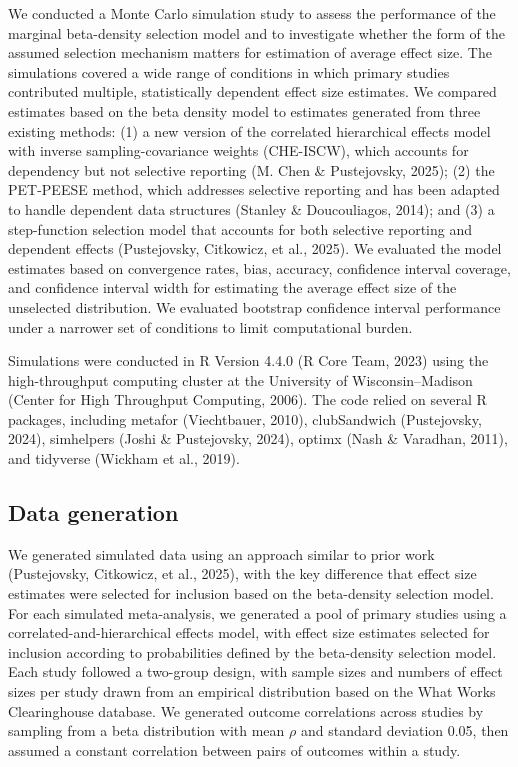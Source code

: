 \documentclass[
  american,
  man, donotrepeattitle,floatsintext]{apa7}
\begin{document}
We conducted a Monte Carlo simulation study to assess the performance of the marginal beta-density selection model and to investigate whether the form of the assumed selection mechanism matters for estimation of average effect size.
The simulations covered a wide range of conditions in which primary studies contributed multiple, statistically dependent effect size estimates.
We compared estimates based on the beta density model to estimates generated from three existing methods: (1) a new version of the correlated hierarchical effects model with inverse sampling-covariance weights (CHE-ISCW), which accounts for dependency but not selective reporting (M. Chen \& Pustejovsky, 2025); (2) the PET-PEESE method, which addresses selective reporting and has been adapted to handle dependent data structures (Stanley \& Doucouliagos, 2014); and (3) a step-function selection model that accounts for both selective reporting and dependent effects (Pustejovsky, Citkowicz, et al., 2025).
We evaluated the model estimates based on convergence rates, bias, accuracy, confidence interval coverage, and confidence interval width for estimating the average effect size of the unselected distribution.
We evaluated bootstrap confidence interval performance under a narrower set of conditions to limit computational burden.

Simulations were conducted in R Version 4.4.0 (R Core Team, 2023) using the high-throughput computing cluster at the University of Wisconsin--Madison (Center for High Throughput Computing, 2006).
The code relied on several R packages, including metafor (Viechtbauer, 2010), clubSandwich (Pustejovsky, 2024), simhelpers (Joshi \& Pustejovsky, 2024), optimx (Nash \& Varadhan, 2011), and tidyverse (Wickham et al., 2019).

\subsection{Data generation}\label{data-generation}

We generated simulated data using an approach similar to prior work (Pustejovsky, Citkowicz, et al., 2025), with the key difference that effect size estimates were selected for inclusion based on the beta-density selection model. For each simulated meta-analysis, we generated a pool of primary studies using a correlated-and-hierarchical effects model, with effect size estimates selected for inclusion according to probabilities defined by the beta-density selection model. Each study followed a two-group design, with sample sizes and numbers of effect sizes per study drawn from an empirical distribution based on the What Works Clearinghouse database. We generated outcome correlations across studies by sampling from a beta distribution with mean \(\rho\) and standard deviation 0.05, then assumed a constant correlation between pairs of outcomes within a study.
\end{document}
